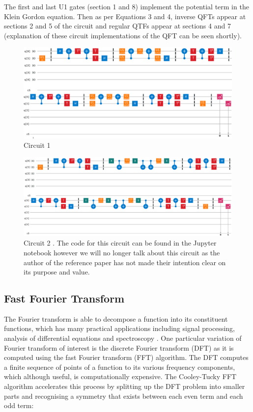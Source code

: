 \documentclass{article}
\begin{document}
The first and last U1 gates (section 1 and 8) implement the potential term in the Klein Gordon equation. Then as per Equations 3 and 4, inverse QFTs appear at sections 2 and 5 of the circuit and regular QTFs appear at sections 4 and 7 (explanation of these circuit implementations of the QFT can be seen shortly).

\begin{figure}[!htb]
\includegraphics[scale=0.42]{../images/circuit1_colour}
  \centering
  \caption{Circuit 1 \cite{ibmq}}
\end{figure}

\begin{figure}[!htb]
\includegraphics[scale=0.34]{../images/circuit2_colour}
  \centering
  \caption{Circuit 2 \cite{ibmq}. The code for this circuit can be found in the Jupyter notebook \cite{ipynb} however we will no longer talk about this circuit as the author of the reference paper has not made their intention clear on its purpose and value.}
\end{figure}

\newpage
\subsection{Fast Fourier Transform}
The Fourier transform is able to decompose a function into its constituent functions, which has many practical applications including signal processing, analysis of differential equations and spectroscopy \cite{fourier}. One particular variation of Fourier transform of interest is the discrete Fourier transform (DFT) as it is computed using the fast Fourier transform (FFT) algorithm. The DFT computes a finite sequence of points of a function to its various frequency components, which although useful, is computationally expensive. The Cooley-Tucky \cite{turkey} FFT algorithm accelerates this process by splitting up the DFT problem into smaller parts and recognising a symmetry that exists between each even term and each odd term:
\end{document}
